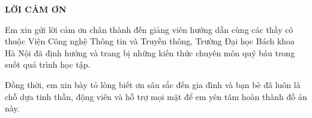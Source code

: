 \begin{center}
    \Large{\textbf{LỜI CẢM ƠN}}\\
\end{center}
\vspace{1cm}

Em xin gửi lời cảm ơn chân thành đến giảng viên hướng dẫn cùng các thầy cô thuộc Viện Công nghệ Thông tin và Truyền thông, Trường Đại học Bách khoa Hà Nội đã định hướng và trang bị những kiến thức chuyên môn quý báu trong suốt quá trình học tập.

Đồng thời, em xin bày tỏ lòng biết ơn sâu sắc đến gia đình và bạn bè đã luôn là chỗ dựa tinh thần, động viên và hỗ trợ mọi mặt để em yên tâm hoàn thành đồ án này.
